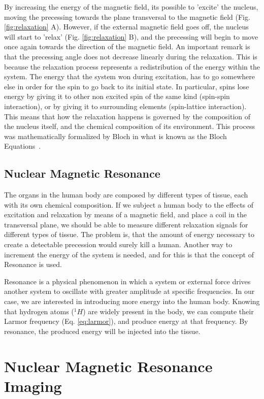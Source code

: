 By increasing the energy of the magnetic field, its possible to 'excite' the
nucleus, moving the precessing towards the plane transversal to the magnetic
field (Fig. \ref{fig:relaxation} A). However, if the external magnetic field
goes off, the nucleus will start to 'relax' (Fig. \ref{fig:relaxation} B), and
the precessing will begin to move once again towards the direction of the
magnetic field. An important remark is that the precessing angle does not
decrease linearly during the relaxation. This is because the relaxation
process represents a redistribution of the energy within the system. The energy that
the system won during excitation, has to go somewhere else in order for the
spin to go back to its initial state. In particular, spins lose energy by 
giving it to other non excited spin of the same kind (spin-spin interaction),
or by giving it to surrounding elements (spin-lattice interaction). This means
that how the relaxation happens is governed by the composition of the nucleus
itself, and the chemical composition of its environment. This process was
mathematically formalized by Bloch in what is known as the Bloch
Equations~\cite{Bloch1946}.

\subsection{Nuclear Magnetic Resonance}
The organs in the human body are composed by different types of tissue, each
with its own chemical composition. If we subject a human body to the effects
of excitation and relaxation by means of a magnetic field, and place a coil
in the transversal plane, we should be able to measure different relaxation
signals for different types of tissue. The problem is, that the amount of 
energy necessary to create a detectable precession would surely kill a human.
Another way to increment the energy of the system is needed, and for this is 
that the concept of Resonance is used.

Resonance is a physical phenomenon in which a system or external force drives
another system to oscillate with greater amplitude at specific frequencies.
In our case, we are interested in introducing more energy into the human body.
Knowing that hydrogen atoms ($^1 H$) are widely present in the body, we can
compute their Larmor frequency (Eq. \ref{eq:larmor}), and produce energy at
that frequency. By resonance, the produced energy will be injected into the
tissue.

\section{Nuclear Magnetic Resonance Imaging}

